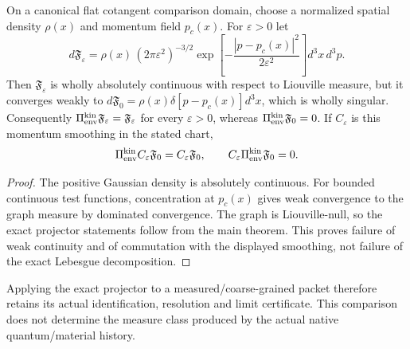 \documentclass[12pt,a4paper]{article}
\begin{document}
\begin{proposition}
\label{p8:prop:v2187-kinetic-smoothing-diagnostic}
On a canonical flat cotangent comparison domain, choose a normalized spatial
density $\rho(x)$ and momentum field $p_c(x)$.  For $\varepsilon>0$ let
\[
 d\mathfrak F_\varepsilon
 =\rho(x)\,(2\pi\varepsilon^2)^{-3/2}
   \exp\!\left[-\frac{|p-p_c(x)|^2}{2\varepsilon^2}\right]d^3x\,d^3p.
\]
Then $\mathfrak F_\varepsilon$ is wholly absolutely continuous with respect
to Liouville measure, but it converges weakly to
$d\mathfrak F_0=\rho(x)\delta[p-p_c(x)]d^3x$, which is wholly singular.
Consequently $\Pi_{\rm env}^{\rm kin}\mathfrak F_\varepsilon
=\mathfrak F_\varepsilon$ for every $\varepsilon>0$, whereas
$\Pi_{\rm env}^{\rm kin}\mathfrak F_0=0$.
If $C_\varepsilon$ is this momentum smoothing in the stated chart,
\[
 \Pi_{\rm env}^{\rm kin}C_\varepsilon\mathfrak F_0
 =C_\varepsilon\mathfrak F_0,
 \qquad C_\varepsilon\Pi_{\rm env}^{\rm kin}\mathfrak F_0=0.
\]
\end{proposition}
\begin{proof}
The positive Gaussian density is absolutely continuous.  For bounded
continuous test functions, concentration at $p_c(x)$ gives weak convergence
to the graph measure by dominated convergence.  The graph is Liouville-null,
so the exact projector statements follow from the main theorem.  This proves
failure of weak continuity and of commutation with the displayed smoothing,
not failure of the exact Lebesgue decomposition.
\end{proof}
Applying the exact projector to a measured/coarse-grained packet therefore
retains its actual identification, resolution and limit certificate.  This
comparison does not determine the measure class produced by the actual
native quantum/material history.
\end{document}
